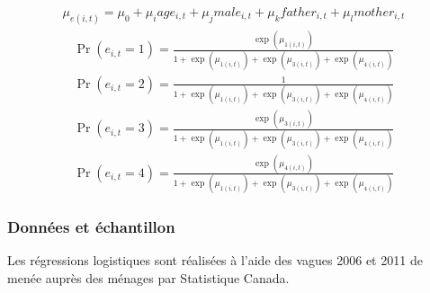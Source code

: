 \documentclass[letterpaper,10pt,french]{sphinxmanual}
\begin{document}
\begin{equation*}
\begin{split}\mu_{e(i,t)} = \mu_{0} + \mu_{i} age_{i,t} + \mu_{j} male_{i,t} + \mu_{k} father_{i,t} + \mu_{l} mother_{i,t}\end{split}
\end{equation*}\begin{equation*}
\begin{split}\Pr(e_{i,t}=1) = \frac{\exp(\mu_{1(i,t)})}{1+\exp(\mu_{1(i,t)})+\exp(\mu_{3(i,t)})+\exp(\mu_{4(i,t)})}\end{split}
\end{equation*}\begin{equation*}
\begin{split}\Pr(e_{i,t}=2) = \frac{1}{1+\exp(\mu_{1(i,t)})+\exp(\mu_{3(i,t)})+\exp(\mu_{4(i,t)})}\end{split}
\end{equation*}\begin{equation*}
\begin{split}\Pr(e_{i,t}=3) = \frac{\exp(\mu_{3(i,t)})}{1+\exp(\mu_{1(i,t)})+\exp(\mu_{3(i,t)})+\exp(\mu_{4(i,t)})}\end{split}
\end{equation*}\begin{equation*}
\begin{split}\Pr(e_{i,t}=4) = \frac{\exp(\mu_{4(i,t)})}{1+\exp(\mu_{1(i,t)})+\exp(\mu_{3(i,t)})+\exp(\mu_{4(i,t)})}\end{split}
\end{equation*}

\subsubsection{Données et échantillon}
\label{\detokenize{methodologie:id2}}
Les régressions logistiques sont réalisées à l’aide des vagues 2006 et 2011 de  menée auprès des ménages par Statistique Canada.
\end{document}
